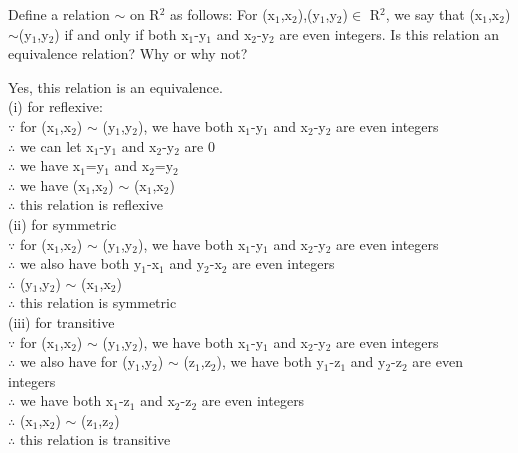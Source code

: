 \documentclass[11pt, a4paper, UTF8]{ctexart}
\begin{document}
\begin{problem}[UD:10.4]
Define a relation $\sim$ on R$^2$ as follows: For (x$_1$,x$_2$),(y$_1$,y$_2$)$\in$ R$^2$, we say that (x$_1$,x$_2$)$\sim$(y$_1$,y$_2$) if and only if both x$_1$-y$_1$ and x$_2$-y$_2$ are even integers. Is this relation an equivalence relation? Why or why not?
\end{problem}
\begin{solution}
Yes, this relation is an equivalence.\\
(i) for reflexive:\\
\indent $\because$  for (x$_1$,x$_2$) $\sim$ (y$_1$,y$_2$), we have both x$_1$-y$_1$ and x$_2$-y$_2$ are even integers\\
\indent $\therefore$  we can let x$_1$-y$_1$ and x$_2$-y$_2$ are 0\\
\indent $\therefore$  we have x$_1$=y$_1$ and x$_2$=y$_2$\\
\indent $\therefore$  we have (x$_1$,x$_2$) $\sim$ (x$_1$,x$_2$)\\
\indent $\therefore$  this relation is reflexive\\
(ii) for symmetric\\
\indent $\because$  for (x$_1$,x$_2$) $\sim$ (y$_1$,y$_2$), we have both x$_1$-y$_1$ and x$_2$-y$_2$ are even integers\\
\indent $\therefore$  we also have both y$_1$-x$_1$ and y$_2$-x$_2$ are even integers\\
\indent $\therefore$  (y$_1$,y$_2$) $\sim$ (x$_1$,x$_2$)\\
\indent $\therefore$  this relation is symmetric\\
(iii)  for transitive\\
\indent $\because$  for (x$_1$,x$_2$) $\sim$ (y$_1$,y$_2$), we have both x$_1$-y$_1$ and x$_2$-y$_2$ are even integers\\
\indent $\therefore$  we also have for (y$_1$,y$_2$) $\sim$ (z$_1$,z$_2$), we have both y$_1$-z$_1$ and y$_2$-z$_2$ are even integers\\
\indent $\therefore$  we have both x$_1$-z$_1$ and x$_2$-z$_2$ are even integers\\
\indent $\therefore$  (x$_1$,x$_2$) $\sim$ (z$_1$,z$_2$)\\
\indent $\therefore$  this relation is transitive\\
\end{solution}


\end{document}
